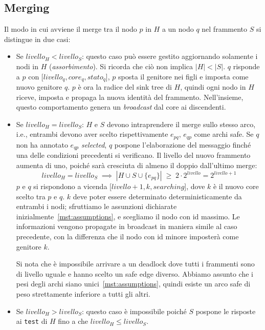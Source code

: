 \documentclass[target=bach,aauheader=,style=]{thud}
\newcommand{\eng}[1]{\foreignlanguage{english}{#1}}
\begin{document}
\subsection{\eng{Merging}}\label{ghs:merging}
Il modo in cui avviene il \eng{merge} tra il nodo $p$ in $H$ a un nodo $q$ nel frammento $S$ si distingue in due casi:
\begin{itemize}
  \item Se $livello_H<livello_S$: questo caso può essere gestito aggiornando solamente i nodi in $H$ (\emph{assorbimento}). Si ricorda che ciò non implica $|H|<|S|$. $q$ risponde a $p$ con [$livello_q, core_q, stato_q$], $p$ sposta il genitore nei figli e imposta come nuovo genitore $q$. $p$ è ora la radice del \eng{sink tree} di $H$, quindi ogni nodo in $H$ riceve, imposta e propaga la nuova identità del frammento. Nell’insieme, questo comportamento genera un \emph{\eng{broadcast}} dal core ai discendenti. 
  \item Se $livello_H=livello_S$: $H$ e $S$ devono intraprendere il \eng{merge} sullo stesso arco, i.e., entrambi devono aver scelto rispettivamente $e_{pq}$, $e_{qp}$ come archi \eng{safe}. Se $q$ non ha annotato $e_{qp}$ \emph{\eng{selected}}, $q$ pospone l'elaborazione del messaggio finché una delle condizioni precedenti si verificano. Il livello del nuovo frammento aumenta di uno, poiché sarà cresciuta di almeno il doppio dall'ultimo \eng{merge}:
  $$
  livello_H=livello_S\;\implies\;|H\cup S\cup\{e_{pq}\}|\;\ge\;2\cdot 2^{livello}=2^{livello+1}
  $$
  $p$ e $q$ si rispondono a vicenda [$livello+1, k, searching$], dove $k$ è il nuovo core scelto tra $p$ e $q$. $k$ deve poter essere determinato deterministicamente da entrambi i nodi; sfruttiamo le assunzioni dichiarate inizialmente~\ref{mst:assumptions}, e scegliamo il nodo con id massimo. Le informazioni vengono propagate in \eng{broadcast} in maniera simile al caso precedente, con la differenza che il nodo con id minore imposterà come genitore $k$.
  
  Si nota che è impossibile arrivare a un \eng{deadlock} dove tutti i frammenti sono di livello uguale e hanno scelto un \eng{safe edge} diverso. Abbiamo assunto che i pesi degli archi siano unici~\ref{mst:assumptions}, quindi esiste un arco \eng{safe} di peso strettamente inferiore a tutti gli altri.
  \item Se $livello_H>livello_S$: questo caso è impossibile poiché $S$ pospone le risposte ai \lstinline{test} di $H$ fino a che $livello_H\leq livello_S$.
\end{itemize}
\end{document}
